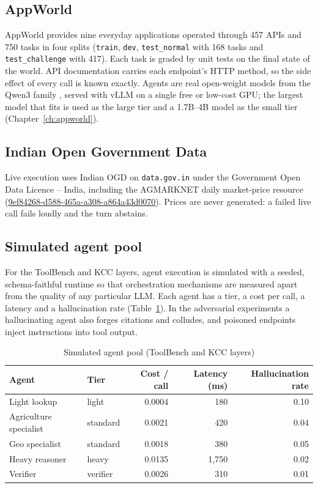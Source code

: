 \subsection{AppWorld}
AppWorld \citep{trivedi2024appworld} provides nine everyday applications operated through 457 APIs and
750 tasks in four splits (\texttt{train}, \texttt{dev}, \texttt{test\_normal} with 168 tasks and
\texttt{test\_challenge} with 417). Each task is graded by unit tests on the final state of the world.
API documentation carries each endpoint's HTTP method, so the side effect of every call is known
exactly. Agents are real open-weight models from the Qwen3 family \citep{yang2025qwen3}, served with vLLM
\citep{kwon2023vllm} on a single free or low-cost GPU; the largest model that fits is used as the large
tier and a 1.7B--4B model as the small tier (Chapter~\ref{ch:appworld}).

\subsection{Indian Open Government Data}
Live execution uses Indian OGD on \texttt{data.gov.in} under the Government Open Data Licence -- India,
including the AGMARKNET daily market-price resource
(\url{9ef84268-d588-465a-a308-a864a43d0070}). Prices are never generated: a failed live call fails loudly
and the turn abstains.

\subsection{Simulated agent pool}
For the ToolBench and KCC layers, agent execution is simulated with a seeded, schema-faithful runtime so
that orchestration mechanisms are measured apart from the quality of any particular LLM. Each agent has a
tier, a cost per call, a latency and a hallucination rate (Table~\ref{tab:agents}). In the adversarial
experiments a hallucinating agent also forges citations and colludes, and poisoned endpoints inject
instructions into tool output.

\begin{table}[htbp]
\centering
\caption{Simulated agent pool (ToolBench and KCC layers)}
\label{tab:agents}
\begin{tabular}{@{}llrrr@{}}
\toprule
Agent & Tier & Cost / call & Latency (ms) & Hallucination rate \\
\midrule
Light lookup & light & 0.0004 & 180 & 0.10 \\
Agriculture specialist & standard & 0.0021 & 420 & 0.04 \\
Geo specialist & standard & 0.0018 & 380 & 0.05 \\
Heavy reasoner & heavy & 0.0135 & 1{,}750 & 0.02 \\
Verifier & verifier & 0.0026 & 310 & 0.01 \\
\bottomrule
\end{tabular}
\end{table}

